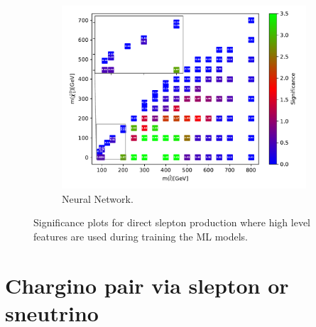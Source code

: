 \begin{figure}[H]
    \begin{subfigure}[t!]{0.49\textwidth}
    \includegraphics[width = \textwidth]{Figures/Significances/significance_NN_slepslep_High_level.pdf}
    \caption{Neural Network.}
        \label{fig:signHighSlepSlepNN}
    \end{subfigure}
    \caption{Significance plots for direct slepton production where high level features are used during training the ML models.}
    \label{fig:signHighSlepSlep}
\end{figure}















\section{Chargino pair via slepton or sneutrino}



